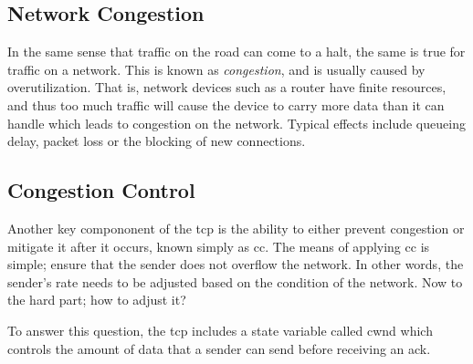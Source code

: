 \subsection{Network Congestion}

In the same sense that traffic on the road can come to a halt, the same is true for traffic on a network. This is known as \textit{congestion}, and is usually caused by overutilization. That is, network devices such as a router have finite resources, and thus too much traffic will cause the device to carry more data than it can handle which leads to congestion on the network. Typical effects include queueing delay, packet loss or the blocking of new connections.



\subsection{Congestion Control}

Another key compononent of the \gls{tcp} is the ability to either prevent congestion or mitigate it after it occurs, known simply as \gls{cc}. The means of applying \gls{cc} is simple; ensure that the sender does not overflow the network. In other words, the sender's rate needs to be adjusted based on the condition of the network. Now to the hard part; how to adjust it?

To answer this question, the \gls{tcp} includes a state variable called \gls{cwnd} which controls the amount of data that a sender can send before receiving an \gls{ack}.






